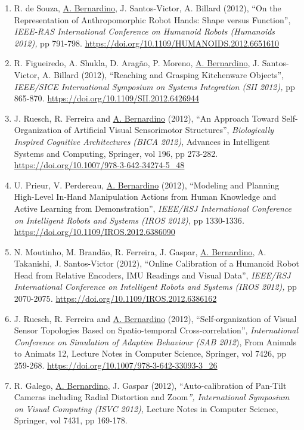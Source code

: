 \begin{enumerate}
\item
  R. de Souza, \ul{A. Bernardino}, J. Santos-Victor, A. Billard (2012),
  ``On the Representation of Anthropomorphic Robot Hands: Shape versus
  Function'', \emph{IEEE-RAS International Conference on Humanoid Robots
  (Humanoids 2012),} pp 791-798.
  \url{https://doi.org/10.1109/HUMANOIDS.2012.6651610}~
\item
  R. Figueiredo, A. Shukla, D. Aragão, P. Moreno, \ul{A. Bernardino}, J.
  Santos-Victor, A. Billard (2012), ``Reaching and Grasping Kitchenware
  Objects'', \emph{IEEE/SICE International Symposium on Systems
  Integration (SII 2012),} pp 865-870\emph{.}
  \url{https://doi.org/10.1109/SII.2012.6426944}
\item
  J. Ruesch, R. Ferreira and \ul{A. Bernardino} (2012), ``An Approach
  Toward Self-Organization of Artificial Visual Sensorimotor
  Structures'', \emph{Biologically Inspired Cognitive Architectures
  (BICA 2012)}, Advances in Intelligent Systems and Computing, Springer,
  vol 196, pp 273-282.
  \url{https://doi.org/10.1007/978-3-642-34274-5_48}
\item
  U. Prieur, V. Perdereau, \ul{A. Bernardino} (2012), ``Modeling and
  Planning High-Level In-Hand Manipulation Actions from Human Knowledge
  and Active Learning from Demonstration'', \emph{IEEE/RSJ International
  Conference on Intelligent Robots and Systems (IROS 2012),} pp
  1330-1336\emph{.} \url{https://doi.org/10.1109/IROS.2012.6386090}~
\item
  N. Moutinho, M. Brandão, R. Ferreira, J. Gaspar, \ul{A. Bernardino},
  A. Takanishi, J. Santos-Victor (2012), ``Online Calibration of a
  Humanoid Robot Head from Relative Encoders, IMU Readings and Visual
  Data'', \emph{IEEE/RSJ International Conference on Intelligent Robots
  and Systems (IROS 2012),} pp 2070-2075\emph{.}
  \url{https://doi.org/10.1109/IROS.2012.6386162}~
\item
  J. Ruesch, R. Ferreira and \ul{A. Bernardino} (2012),
  ``Self-organization of Visual Sensor Topologies Based on
  Spatio-temporal Cross-correlation'', \emph{International Conference on
  Simulation of Adaptive Behaviour (SAB 2012}), From Animals to Animats
  12, Lecture Notes in Computer Science, Springer, vol 7426, pp 259-268.
  \url{https://doi.org/10.1007/978-3-642-33093-3_26}~
\item
  R. Galego, \ul{A. Bernardino}, J. Gaspar (2012), ``Auto-calibration of
  Pan-Tilt Cameras including Radial Distortion and Zoom\emph{'',
  International Symposium on Visual Computing (ISVC 2012),} Lecture
  Notes in Computer Science, Springer, vol 7431, pp 169-178.

\end{enumerate}
